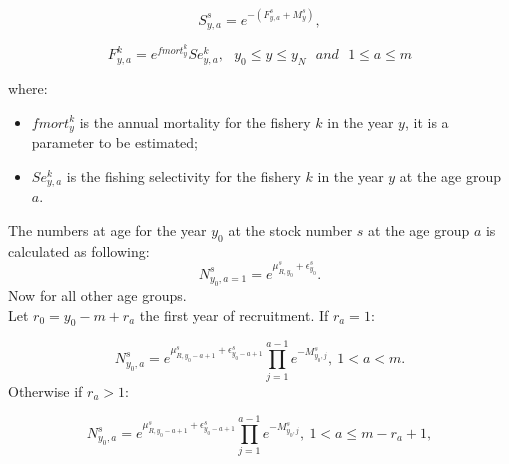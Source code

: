 \documentclass{article}
\begin{document}
\begin{equation}
S^s_{y,a}=e^{-(F^s_{y,a}+M^{s}_{y})},
\end{equation}

\begin{equation}
F^k_{y,a}=e^{fmort^k_y}Se^k_{y,a}, \ \ \ y_0\leq y \leq y_N \ \ \ and  \ \ \  1\leq a \leq m
\end{equation}

where:
\begin{itemize}

    
    \item $fmort^k_y$ is the annual mortality for the fishery $k$ in the year $y$, it is a parameter to be estimated;
    \item $Se^k_{y,a}$ is the fishing selectivity for the fishery $k$ in the year $y$ at the age group $a$.

\end{itemize}

\hfill

The numbers at age for the year $y_0$ at the stock number $s$ at the age group  $a$ is calculated as following:
\begin{equation}
N^s_{y_0,a=1}=e^{\mu^s_{R,y_0} + \epsilon^s_{y_0}}.
\end{equation}
Now for all other age groups.\\
    Let $r_0 = y_0-m+r_a$ the first year of recruitment. If $r_a=1$:

\begin{equation}
N^s_{y_0,a}=e^{\mu_{R,y_0-a+1}^s + \epsilon^s_{y_0-a+1}}
            \prod_{j=1}^{a-1}e^{-M^s_{y_0,j}}, \ 1<a<m.
\end{equation}
Otherwise if $r_a>1$:

\begin{equation}
N^s_{y_0,a}=e^{\mu_{R,y_0-a+1}^s + \epsilon^s_{y_0-a+1}}                          \prod_{j=1}^{a-1}e^{-M^s_{y_0,j}}, \ 1<a\leq m-r_a+1,
\end{equation}
\end{document}
